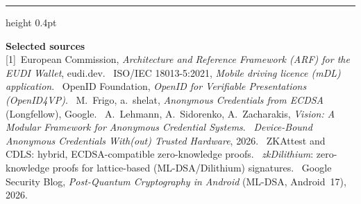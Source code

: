 \documentclass[11pt]{article}
\begin{document}
\vspace{6pt}
{\color{accent}\hrule height 0.4pt}
\vspace{4pt}
{\footnotesize
\noindent\textbf{\sffamily Selected sources}\\[2pt]
[1]~European Commission, \textit{Architecture and Reference Framework (ARF) for the EUDI Wallet}, eudi.dev. \quad
[2]~ISO/IEC 18013-5:2021, \textit{Mobile driving licence (mDL) application}. \quad
[3]~OpenID Foundation, \textit{OpenID for Verifiable Presentations (OpenID4VP)}. \quad
[4]~M.~Frigo, a.~shelat, \textit{Anonymous Credentials from ECDSA} (Longfellow), Google. \quad
[5]~A.~Lehmann, A.~Sidorenko, A.~Zacharakis, \textit{Vision: A Modular Framework for Anonymous Credential Systems}. \quad
[6]~\textit{Device-Bound Anonymous Credentials With(out) Trusted Hardware}, 2026. \quad
[7]~ZKAttest and CDLS: hybrid, ECDSA-compatible zero-knowledge proofs. \quad
[8]~\textit{zkDilithium}: zero-knowledge proofs for lattice-based (ML-DSA/Dilithium) signatures. \quad
[9]~Google Security Blog, \textit{Post-Quantum Cryptography in Android} (ML-DSA, Android~17), 2026.
}
\end{document}
